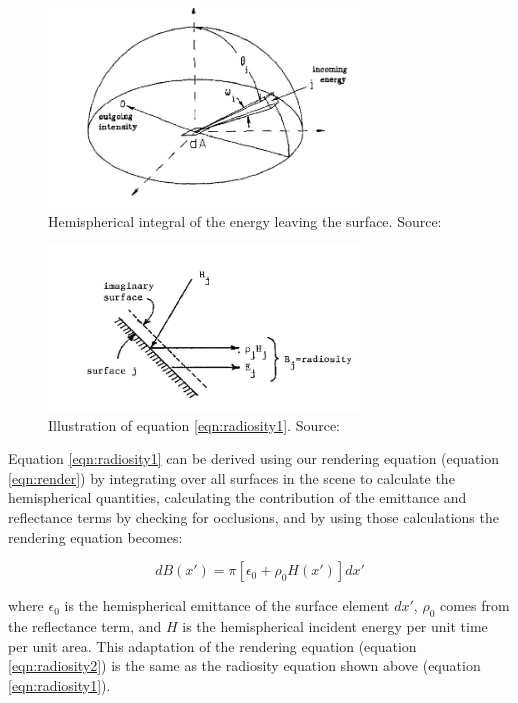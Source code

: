 \begin{figure}[h!]
  \centering
    \includegraphics[width=0.75\textwidth]{radiosityCalc1.jpg}
  \caption{Hemispherical integral of the energy leaving the surface. Source: \protect\cite{Immel1986}}
	\label{fig:radiosityCalc1}
\end{figure}

\begin{figure}[h!]
  \centering
    \includegraphics[width=0.75\textwidth]{radiosityCalc2.jpg}
  \caption{Illustration of equation \ref{eqn:radiosity1}. Source: \protect\cite{Goral1984}}
	\label{fig:radiosityCalc2}
\end{figure}

Equation \ref{eqn:radiosity1} can be derived using our rendering equation (equation \ref{eqn:render}) \cite{Kajiya1986} by integrating over all surfaces in the scene to calculate the hemispherical quantities, calculating the contribution of the emittance and reflectance terms by checking for occlusions, and by using those calculations the rendering equation becomes:

\begin{equation}
dB(x') = \pi[\epsilon_{0} + \rho_{0}H(x')]dx' \label{eqn:radiosity2}
\end{equation}

where $\epsilon_{0}$ is the hemispherical emittance of the surface element $dx'$, $\rho_{0}$ comes from the reflectance term, and $H$ is the hemispherical incident energy per unit time per unit area.  This adaptation of the rendering equation (equation \ref{eqn:radiosity2}) is the same as the radiosity equation shown above (equation \ref{eqn:radiosity1}).

